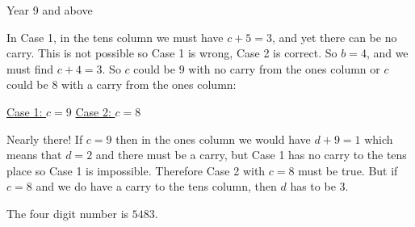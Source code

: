 \begin{MyInnerBox}{Year 9 and above}
{\begin{MySolutionBox}
        \normalfont
        In Case 1, in the tens column we must have \(c+5=3\), and yet there can be no carry. This is not possible so Case 1 is wrong, Case 2 is correct. So \(b=4\), and we must find \(c+4=3\). So \(c\) could be \(9\) with no carry from the ones column or \(c\) could be \(8\) with a carry from the ones column:\par
        \underline{Case 1: \(c=9\)}\qquad\:   \underline{Case 2: \(c=8\)}\par
        \ttfamily
        \qquad\qquad
        \par
        \normalfont
        Nearly there! If \(c=9\) then in the ones column we would have \(d+9=1\) which means that \(d=2\) and there must be a carry, but Case 1 has no carry to the tens place so Case 1 is impossible. Therefore Case 2 with \(c=8\) must be true. But if \(c=8\) and we do have a carry to the tens column, then \(d\) has to be \(3\).\par
        \ttfamily
        \par
        \normalfont
        The four digit number is \(5483\).
      \end{MySolutionBox}
    }{}%
    \end{MyInnerBox}

